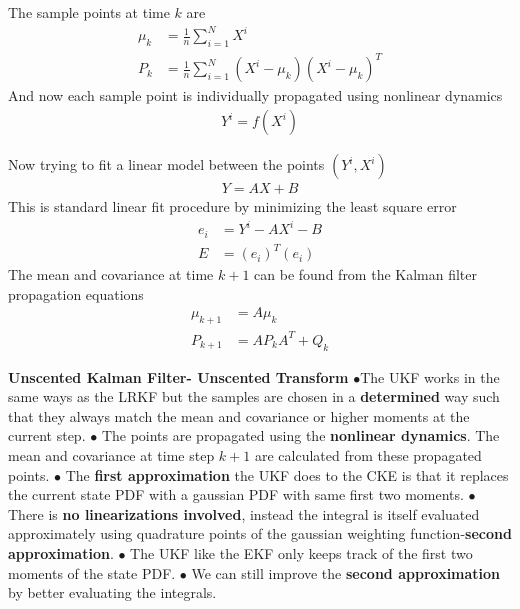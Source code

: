 \documentclass[landscape]{slides}
\begin{document}
\begin{slide}
	The sample points at time $k$  are 
\begin{align*}
\mu_k&=\frac{1}{n}\sum_{i=1}^{N}X^i\\
P_k&=\frac{1}{n}\sum_{i=1}^{N}(X^i-\mu_k)(X^i-\mu_k)^T
\end{align*}
And now each sample point is individually propagated using nonlinear dynamics
\begin{align*}
Y^i=f(X^i)
\end{align*} 
	\end{slide}
\begin{slide}	 
Now trying to fit a linear model between the points $(Y^i,X^i)$
\begin{align*}
Y=AX+B
\end{align*}
This is standard linear fit procedure by minimizing the least square error
\begin{align*}
e_i&=Y^i-AX^i-B\\
E&=(e_i)^T(e_i)
\end{align*}
The mean and covariance at time $k+1$ can be found from the Kalman filter propagation equations
	\begin{align*}
\mu_{k+1}&=A\mu_k\\
P_{k+1}&=AP_kA^T+Q_k
\end{align*}
	\end{slide}
\begin{slide}

 {\bf Unscented Kalman Filter- Unscented Transform}\newline\newline
 $\bullet$The UKF works in the same ways as the LRKF but the samples are chosen in a {\bf determined} way such that they always match the mean and covariance or higher moments at the current step.\newline\newline
 $\bullet$ The points are propagated using the {\bf nonlinear dynamics}. The mean and covariance at time step $k+1$ are calculated from these propagated points.\newline\newline
 $\bullet$ The {\bf first approximation} the UKF does to the CKE is that it replaces the current state PDF with a gaussian PDF with same first two moments. \newline\newline
 $\bullet$ There is {\bf no linearizations involved}, instead the integral is itself evaluated approximately using quadrature points of the gaussian weighting function-{\bf second approximation}.\newline\newline
  $\bullet$ The UKF like the EKF only keeps track of the first two moments of the state PDF.\newline\newline
  $\bullet$ We can still improve the {\bf second approximation} by better evaluating the integrals.
 	\end{slide}
\end{document}
